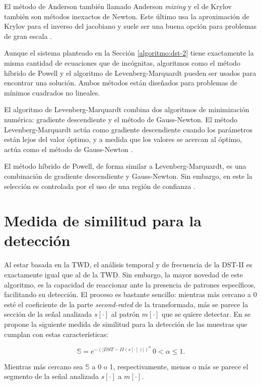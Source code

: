 El método de Anderson también llamado Anderson \textit{mixing} \cite{Eyert1996} y el de Krylov también son métodos inexactos de Newton. 
Este último usa la aproximación de Krylov para el inverso del jacobiano y suele ser una buena opción para problemas
de gran escala \cite{kelley1995iterative}.

Aunque el sistema planteado en la Sección \ref{algoritmo:dst-2} tiene exactamente la misma cantidad de ecuaciones que de 
incógnitas, algoritmos como el método híbrido de Powell y el algoritmo de Levenberg-Marquardt pueden 
ser usados para encontrar una solución. Ambos métodos están diseñados para problemas de mínimos cuadrados no lineales.

El algoritmo de Levenberg-Marquardt combina dos algoritmos de minimización numérica:
gradiente descendiente y el método de Gauss-Newton. El método Levenberg-Marquardt actúa como gradiente 
descendiente cuando los parámetros están lejos del valor óptimo, y a medida que los valores se acercan 
al óptimo, actúa como el método de Gauss-Newton \cite{lourakis}.

El método híbrido de Powell, de forma similar a Levenberg-Marquardt, es una combinación de gradiente descendiente y Gauss-Newton.
Sin embargo, en este la selección es controlada por el uso de una región de confianza \cite{lourakis}.

\section{Medida de similitud para la detección}

Al estar basada en la TWD, el análisis temporal y de frecuencia de la DST-II es exactamente igual que al de la TWD.
Sin embargo, la mayor novedad de este algoritmo, es la capacidad de reaccionar ante la presencia de 
patrones específicos, facilitando su detección. El proceso es bastante sencillo:
mientras más cercano a $0$ esté el coeficiente de la parte \textit{second-rated} de la transformada, más se parece
la sección de la señal analizada $s[\cdot]$ al patrón $m[\cdot]$ que se quiere detectar. En \cite{Guido2018} se
propone la siguiente medida de similitud para la detección de las muestras que cumplan con estas características:

\begin{equation}
	\mathbb{S} = e^{-{(|DST-II(s[\cdot])|)}^{\alpha}} \,0 < \alpha \leq 1.
\end{equation}\label{eq:s-heuristic}

Mientras más cercano sea $\mathbb{S}$ a 0 o 1, respectivamente, menos o más se parece el segmento de
la señal analizada $s[\cdot]$ a $m[\cdot]$.

